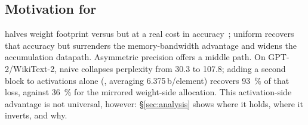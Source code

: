\subsection{Motivation for \fpfourres}
\label{sec:bg-motiv}

\fpfour{} halves weight footprint versus \fpeight{} but at a real cost in accuracy~\cite{m2xfp2026}; uniform \fpeight{} recovers that accuracy but surrenders the memory-bandwidth advantage and widens the accumulation datapath. Asymmetric precision offers a middle path. On GPT-2/WikiText-2, naive \fpfour{} collapses perplexity from 30.3 to 107.8; adding a second \fpfour{} block to activations alone (\fpfourres, averaging 6.375\,b/element) recovers \SI{93}{\percent} of that loss, against \SI{36}{\percent} for the mirrored weight-side allocation. This activation-side advantage is not universal, however: \S\ref{sec:analysis} shows where it holds, where it inverts, and why.